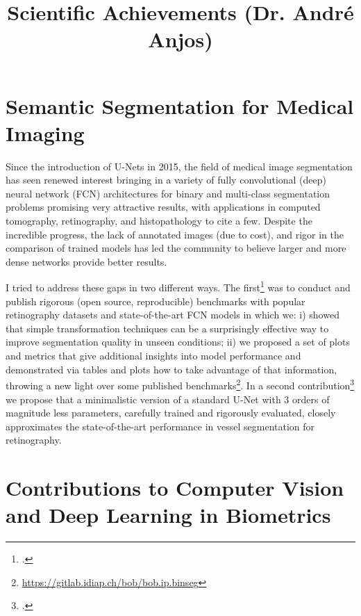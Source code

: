 \documentclass[a4paper,10pt,onecolumn]{article}
\author{}
\date{}
\begin{document}

\title{Scientific Achievements (Dr. André Anjos)}
\maketitle

\section{Semantic Segmentation for Medical Imaging}

Since the introduction of U-Nets in 2015, the field of medical image
segmentation has seen renewed interest bringing in a variety of fully
convolutional (deep) neural network (FCN) architectures for binary and
multi-class segmentation problems promising very attractive results, with
applications in computed tomography, retinography, and histopathology to cite a
few.  Despite the incredible progress, the lack of annotated images (due to
cost), and rigor in the comparison of trained models has led the community to
believe larger and more dense networks provide better results.

I tried to address these gaps in two different ways.  The
first\footcite{arxiv-2019} was to conduct and publish rigorous (open source,
reproducible) benchmarks with popular retinography datasets and
state-of-the-art FCN models in which we: i) showed that simple transformation
techniques can be a surprisingly effective way to improve segmentation quality
in unseen conditions; ii) we proposed a set of plots and metrics that give
additional insights into model performance and demonstrated via tables and
plots how to take advantage of that information, throwing a new light over some
published benchmarks\footnote{\url{https://gitlab.idiap.ch/bob/bob.ip.binseg}}.
In a second contribution\footcite{nsr-2022} we propose that a minimalistic
version of a standard U-Net with 3 orders of magnitude less parameters,
carefully trained and rigorously evaluated, closely approximates the
state-of-the-art performance in vessel segmentation for retinography.

\section{Contributions to Computer Vision and Deep Learning in Biometrics}
\end{document}
